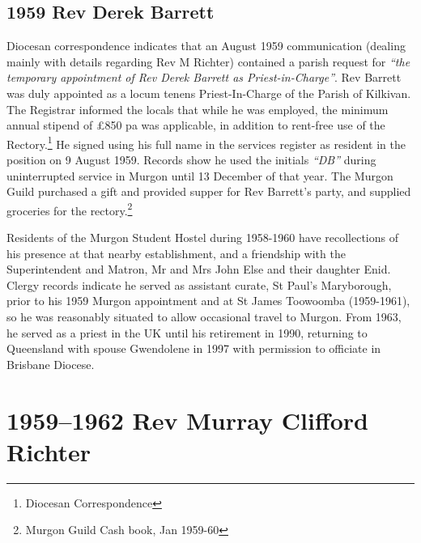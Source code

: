 \section{1959 Rev Derek Barrett}



Diocesan correspondence indicates that an August 1959 communication (dealing mainly with details regarding Rev M Richter) contained a parish request for \emph{``the temporary appointment of Rev Derek Barrett as Priest-in-Charge''}. Rev Barrett was duly appointed as a locum tenens Priest-In-Charge of the Parish of Kilkivan. The Registrar informed the locals that while he was employed, the minimum annual stipend of \pounds850 pa was applicable, in addition to rent-free use of the Rectory.\footnote{Diocesan Correspondence} He signed using his full name in the services register as resident in the position on 9 August 1959. Records show he used the initials \emph{``DB''} during uninterrupted service in Murgon until 13 December of that year. The Murgon Guild purchased a gift and provided supper for Rev Barrett's party, and supplied groceries for the rectory.\footnote{Murgon Guild Cash book, Jan 1959-60}


\balance


Residents of the Murgon Student Hostel during 1958-1960 have recollections of his presence at that nearby establishment, and a friendship with the Superintendent and Matron, Mr and Mrs John Else and their daughter Enid. Clergy records indicate he served as assistant curate, St Paul's Maryborough, prior to his 1959 Murgon appointment and at St James Toowoomba (1959-1961), so he was reasonably situated to allow occasional travel to Murgon. From 1963, he served as a priest in the UK until his retirement in 1990, returning to Queensland with spouse Gwendolene in 1997 with permission to officiate in Brisbane Diocese.



\printendnotes[custom]
\setcounter{endnote}{0}




\chapter{1959--1962 Rev Murray Clifford Richter}
\nobalance








